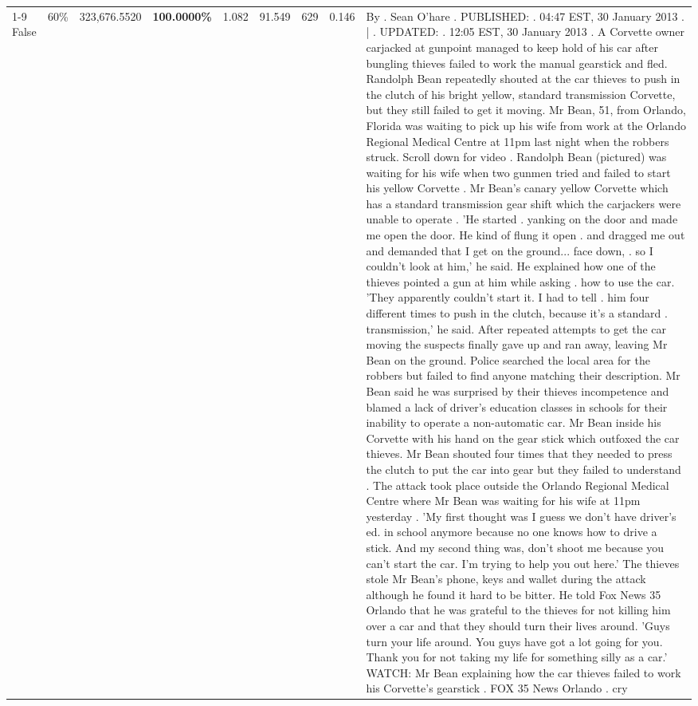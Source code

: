 \begin{table}[H]
\begin{tabular}{lllrlllll}
\cline{1-9} \cline{2-9}
False & 60\% & 323,676.5520 & \bfseries \color{red} 100.0000\% & 1.082 & 91.549 & 629 & 0.146 & By . Sean O'hare . PUBLISHED: . 04:47 EST, 30 January 2013 . | . UPDATED: . 12:05 EST, 30 January 2013 . A Corvette owner carjacked at gunpoint managed to keep hold of his car after bungling thieves failed to work the manual gearstick and fled. Randolph Bean repeatedly shouted at the car thieves to push in the clutch of his bright yellow, standard transmission Corvette, but they still failed to get it moving. Mr Bean, 51, from Orlando, Florida was waiting to pick up his wife from work at the Orlando Regional Medical Centre at 11pm last night when the robbers struck. Scroll down for video . Randolph Bean (pictured) was waiting for his wife when two gunmen tried and failed to start his yellow Corvette . Mr Bean's canary yellow Corvette which has a standard transmission gear shift which the carjackers were unable to operate . 'He started . yanking on the door and made me open the door. He kind of flung it open . and dragged me out and demanded that I get on the ground... face down, . so I couldn't look at him,' he said. He explained how one of the thieves pointed a gun at him while asking . how to use the car. 'They apparently couldn't start it. I had to tell . him four different times to push in the clutch, because it's a standard . transmission,' he said. After repeated attempts to get the car moving the suspects finally gave up and ran away, leaving Mr Bean on the ground. Police searched the local area for the robbers but failed to find anyone matching their description. Mr Bean said he was surprised by their thieves incompetence and blamed a lack of driver's education classes in schools for their inability to operate a non-automatic car. Mr Bean inside his Corvette with his hand on the gear stick which outfoxed the car thieves. Mr Bean shouted four times that they needed to press the clutch to put the car into gear but they failed to understand . The attack took place outside the Orlando Regional Medical Centre where Mr Bean was waiting for his wife at 11pm yesterday . 'My first thought was I guess we don't have driver's ed. in school anymore because no one knows how to drive a stick. And my second thing was, don't shoot me because you can't start the car. I'm trying to help you out here.' The thieves stole Mr Bean's phone, keys and wallet during the attack although he found it hard to be bitter. He told Fox News 35 Orlando that he was grateful to the thieves for not killing him over a car and that they should turn their lives around. 'Guys turn your life around. You guys have got a lot going for you. Thank you for not taking my life for something silly as a car.' WATCH: Mr Bean explaining how the car thieves failed to work his Corvette's gearstick . FOX 35 News Orlando . cry \\

\end{tabular}
\end{table}
